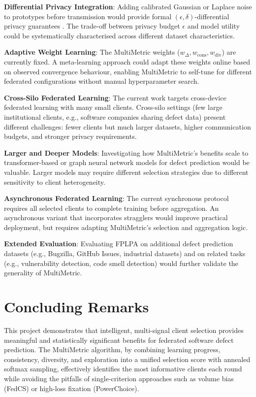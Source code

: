 \textbf{Differential Privacy Integration}: Adding calibrated Gaussian or Laplace noise to prototypes before transmission would provide formal $(\epsilon, \delta)$-differential privacy guarantees \citep{dwork2014algorithmic}. The trade-off between privacy budget $\epsilon$ and model utility could be systematically characterised across different dataset characteristics.

\textbf{Adaptive Weight Learning}: The MultiMetric weights ($w_\Delta, w_{\text{cons}}, w_{\text{div}}$) are currently fixed. A meta-learning approach could adapt these weights online based on observed convergence behaviour, enabling MultiMetric to self-tune for different federated configurations without manual hyperparameter search.

\textbf{Cross-Silo Federated Learning}: The current work targets cross-device federated learning with many small clients. Cross-silo settings (few large institutional clients, e.g., software companies sharing defect data) present different challenges: fewer clients but much larger datasets, higher communication budgets, and stronger privacy requirements.

\textbf{Larger and Deeper Models}: Investigating how MultiMetric's benefits scale to transformer-based or graph neural network models for defect prediction would be valuable. Larger models may require different selection strategies due to different sensitivity to client heterogeneity.

\textbf{Asynchronous Federated Learning}: The current synchronous protocol requires all selected clients to complete training before aggregation. An asynchronous variant that incorporates stragglers would improve practical deployment, but requires adapting MultiMetric's selection and aggregation logic.

\textbf{Extended Evaluation}: Evaluating FPLPA on additional defect prediction datasets (e.g., Bugzilla, GitHub Issues, industrial datasets) and on related tasks (e.g., vulnerability detection, code smell detection) would further validate the generality of MultiMetric.

\section{Concluding Remarks}

This project demonstrates that intelligent, multi-signal client selection provides meaningful and statistically significant benefits for federated software defect prediction. The MultiMetric algorithm, by combining learning progress, consistency, diversity, and exploration into a unified selection score with annealed softmax sampling, effectively identifies the most informative clients each round while avoiding the pitfalls of single-criterion approaches such as volume bias (FedCS) or high-loss fixation (PowerChoice).

